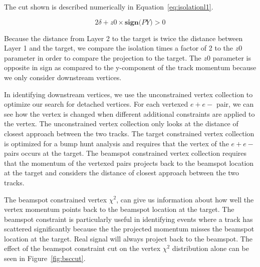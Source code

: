The cut shown is described numerically in Equation~\eqref{eq:isolationl1}.

\begin{equation}
\label{eq:isolationl1}
2\delta+z0\times\textbf{sign($PY$)}>0
\end{equation}
 
Because the distance from Layer 2 to the target is twice the distance between Layer 1 and the target, we compare the isolation times a factor of 2 to the $z0$ parameter in order to compare the projection to the target. The $z0$ parameter is opposite in sign as compared to the y-component of the track momentum because we only consider downstream vertices. 


\indent In identifying downstream vertices, we use the unconstrained vertex collection to optimize our search for detached vertices. For each vertexed $e+e-$ pair, we can see how the vertex is changed when different additional constraints are applied to the vertex. The unconstrained vertex collection only looks at the distance of closest approach between the two tracks. The target constrained vertex collection is optimized for a bump hunt analysis and requires that the vertex of the $e+e-$ pairs occurs at the target. The beamspot constrained vertex collection requires that the momentum of the vertexed pairs projects back to the beamspot location at the target and considers the distance of closest approach between the two tracks. 

The beamspot constrained vertex $\chi^2$, can give us information about how well the vertex momentum points back to the beamspot location at the target. The beamspot constraint is particularly useful in identifying events where a track has scattered significantly because the the projected momentum misses the beamspot location at the target. Real signal will always project back to the beamspot. The effect of the beamspot constraint cut on the vertex  $\chi^2$ distribution alone can be seen in Figure~\ref{fig:bsccut}.

